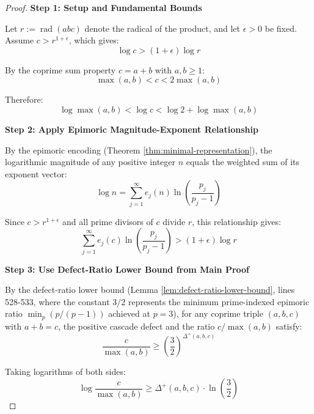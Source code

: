 \begin{proof}

\noindent \textbf{Step 1: Setup and Fundamental Bounds}

Let $r := \operatorname{rad}(abc)$ denote the radical of the product, and let $\epsilon > 0$ be fixed. Assume $c > r^{1+\epsilon}$, which gives:
\begin{equation}
\log c > (1+\epsilon) \log r
\end{equation}

By the coprime sum property $c = a + b$ with $a, b \geq 1$:
\begin{equation}
\max(a,b) < c < 2 \max(a,b)
\end{equation}

Therefore:
\begin{equation}
\log \max(a,b) < \log c < \log 2 + \log \max(a,b)
\end{equation}

\noindent \textbf{Step 2: Apply Epimoric Magnitude-Exponent Relationship}

By the epimoric encoding (Theorem \ref{thm:minimal-representation}), the logarithmic magnitude of any positive integer $n$ equals the weighted sum of its exponent vector:
\begin{equation}
\log n = \sum_{j=1}^{\infty} e_j(n) \ln\left(\frac{p_j}{p_j-1}\right)
\end{equation}

Since $c > r^{1+\epsilon}$ and all prime divisors of $c$ divide $r$, this relationship gives:
\begin{equation}
\sum_{j=1}^{\infty} e_j(c) \ln\left(\frac{p_j}{p_j-1}\right) > (1+\epsilon) \log r
\end{equation}

\noindent \textbf{Step 3: Use Defect-Ratio Lower Bound from Main Proof}

By the defect-ratio lower bound (Lemma \ref{lem:defect-ratio-lower-bound}, lines 528-533, where the constant $3/2$ represents the minimum prime-indexed epimoric ratio $\min_p(p/(p-1))$ achieved at $p=3$), for any coprime triple $(a,b,c)$ with $a + b = c$, the positive cascade defect and the ratio $c/\max(a,b)$ satisfy:
\begin{equation}
\frac{c}{\max(a,b)} \geq \left(\frac{3}{2}\right)^{\Delta^{+}(a,b,c)}
\end{equation}

Taking logarithms of both sides:
\begin{equation}
\log \frac{c}{\max(a,b)} \geq \Delta^{+}(a,b,c) \cdot \ln\left(\frac{3}{2}\right)
\end{equation}


\end{proof}
